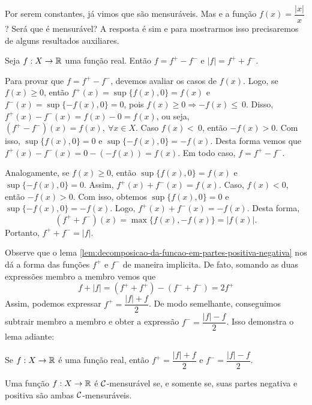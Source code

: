 Por serem constantes, já vimos que são mensuráveis.
Mas e a função $f(x) =\dfrac{|x|}{x}$? Será que é mensurável?
A resposta é sim e para mostrarmos isso precisaremos de alguns resultados auxiliares. 
    \begin{lemma}
    \label{lem:decomposicao-da-funcao-em-partes-positiva-negativa}
        Seja $f: X \to \mathbb{R}$ uma função real. Então $f = f^+ - f^-$ e $|f| = f^+ + f^-$.
    \end{lemma}
    \begin{prova}
            Para provar que $f = f^+ - f^-$, devemos avaliar os casos de $f(x)$. 
            Logo, se $f(x) \geq 0$, então $f^+(x) = \sup\{f(x), 0\} = f(x)$ e $f^-(x) = \sup\{-f(x), 0\} = 0$, pois $f(x) \geq 0 \Rightarrow  - f(x) \leq~0$.
            Disso, $f^+(x) - f^-(x) = f(x) - 0 = f(x)$, ou seja, $(f^+ - f^-)(x) = f(x), \ \forall x \in X$.
            Caso $f(x) <~0$, então $- f(x) > 0$. 
            Com isso,  $\sup\{f(x), 0\} = 0$ e $\sup\{-f(x), 0\} = -f(x)$.
            Desta forma vemos que
            $f^+(x) - f^-(x) = 0 - (-f(x)) = f(x)$.
            Em todo caso, $f = f^+ - f^-$.

            Analogamente, se $f(x) \geq 0$, então  $\sup\{f(x), 0\} = f(x)$ e $\sup\{-f(x), 0\} = 0$.
            Assim, $f^+(x) + f^-(x) = f(x)$.
            Caso, $f(x) < 0$, então $ - f(x) > 0$.
            Com isso, obtemos $\sup\{f(x), 0\} = 0$ e $\sup\{-f(x), 0\} = -f(x)$.
            Logo, $f^+(x) + f^-(x) = -f(x)$.
            Desta forma, 
            $$
            (f^+ + f^-)(x) = \max\{f(x), -f(x)\} = |f(x)|.
            $$
            Portanto, $f^+ + f^- = |f|$.
    \end{prova}

Observe que o lema \ref{lem:decomposicao-da-funcao-em-partes-positiva-negativa} nos dá a forma das funções $f^+$ e $f^-$ de maneira implicita.
De fato, somando as duas expressões membro a membro vemos que 
$$f + |f| = (f^+ + f^+) - (f^- + f^-) = 2f^+$$
Assim, podemos expressar $f^+ = \dfrac{|f| + f}{2}$.
De modo semelhante, conseguimos subtrair membro a membro e obter a expressão $f^- = \dfrac{|f| - f}{2}$. 
Isso demonstra o lema adiante:

    \begin{lemma}
    \label{prop:identidades-das-partes-das-funcoes}
        Se $f: X \to \mathbb{R}$ é uma função real, então $f^+ = \dfrac{|f| + f}{2}$ e $f^- = \dfrac{|f| - f}{2}$.
    \end{lemma}
    \begin{theorem}
        Uma função $f: X \to \mathbb{R}$ é $\operatorname{\mathcal{C}}$-mensurável se, e somente se, suas partes negativa e positiva são ambas $\operatorname{\mathcal{C}}$-mensuráveis. 
    \end{theorem}


